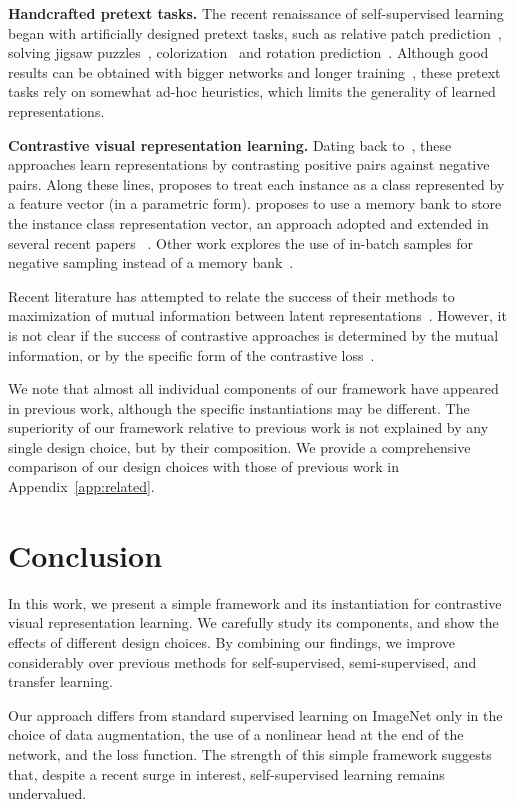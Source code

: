 \textbf{Handcrafted pretext tasks.} The recent renaissance of self-supervised learning began with artificially designed pretext tasks, such as relative patch prediction~\cite{doersch2015unsupervised}, solving jigsaw puzzles~\cite{noroozi2016unsupervised}, colorization~\cite{zhang2016colorful} and rotation prediction~\cite{gidaris2018unsupervised,chen2019self}. Although good results can be obtained with bigger networks and longer training~\cite{kolesnikov2019revisiting}, these pretext tasks rely on somewhat ad-hoc heuristics, which limits the generality of learned representations.

\textbf{Contrastive visual representation learning.} Dating back to~\citet{hadsell2006dimensionality}, these approaches learn representations by contrasting positive pairs against negative pairs. Along these lines, \citet{dosovitskiy2014discriminative} proposes to treat each instance as a class represented by a feature vector (in a parametric form). \citet{wu2018unsupervised} proposes to use a memory bank to store the instance class representation vector, an approach adopted and extended in several recent papers ~\cite{zhuang2019local,tian2019contrastive,he2019momentum,misra2019self}. Other work explores the use of in-batch samples for negative sampling instead of a memory bank~\cite{doersch2017multi,ye2019unsupervised,ji2019invariant}.

Recent literature has attempted to relate the success of their methods to maximization of mutual information between latent representations~\cite{oord2018representation,henaff2019data,hjelm2018learning,bachman2019learning}. However, it is not clear if the success of contrastive approaches is determined by the mutual information, or by the specific form of the contrastive loss~\cite{tschannen2019mutual}. 

We note that almost all individual components of our framework have appeared in previous work, although the specific instantiations may be different. The superiority of our framework relative to previous work is not explained by any single design choice, but by their composition. We provide a comprehensive comparison of our design choices with those of previous work in Appendix~\ref{app:related}.

 \section{Conclusion}
In this work, we present a simple framework and its instantiation for contrastive visual representation learning. We carefully study its components, and show the effects of different design choices. By combining our findings, we improve considerably over previous methods for self-supervised, semi-supervised, and transfer learning.

Our approach differs from standard supervised learning on ImageNet only in the choice of data augmentation, the use of a nonlinear head at the end of the network, and the loss function. The strength of this simple framework suggests that, despite a recent surge in interest, self-supervised learning remains undervalued. 


